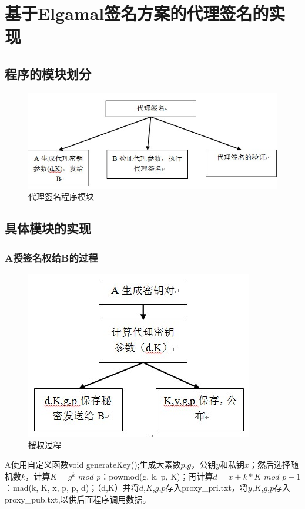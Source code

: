 \section{基于Elgamal签名方案的代理签名的实现}

\subsection{程序的模块划分}

\begin{figure}[H]
\centering
\includegraphics{img/4.jpg}
\caption{代理签名程序模块}
\end{figure}

\subsection{具体模块的实现}

\subsubsection{A授签名权给B的过程}

\begin{figure}[H]
\centering
\includegraphics{img/5.jpg}
\caption{授权过程}
\end{figure}

A使用自定义函数void generateKey();生成大素数$p$,$g$，公钥$y$和私钥$x$；然后选择随机数$k$，计算$K = g^k$ $mod$ $p$：powmod(g, k, p, K)；再计算$d = x + k*K$ $mod$ $p-1$：mad(k, K, x, p, p, d)；（d,K）并将$d$,$K$,$g$,$p$存入proxy\_pri.txt，将$y$,$K$,$g$,$p$存入proxy\_pub.txt,以供后面程序调用数据。


